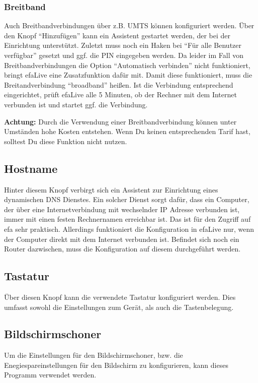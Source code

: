 \documentclass[a4paper,12pt,twoside]{article}
\begin{document}
\subsubsection{Breitband}
\label{breitband}
Auch Breitbandverbindungen über z.B. UMTS können konfiguriert werden.
Über den Knopf "`Hinzufügen"' kann ein
Assistent gestartet werden, der bei der Einrichtung unterstützt.
Zuletzt muss noch ein Haken bei "`Für alle Benutzer
verfügbar"' gesetzt und ggf. die PIN eingegeben werden. Da
leider im Fall von Breitbandverbindungen die Option
"`Automatisch verbinden"' nicht funktioniert,
bringt efaLive eine Zusatzfunktion dafür mit. Damit diese funktioniert,
muss die Breitandverbindung "`broadband"'
heißen. Ist die Verbindung entsprechend eingerichtet, prüft efaLive
alle 5 Minuten, ob der Rechner mit dem Internet verbunden ist und
startet ggf. die Verbindung.

\bigskip
\textbf{Achtung:} Durch die Verwendung einer Breitbandverbindung können unter
Umständen hohe Kosten entstehen. Wenn Du keinen entsprechenden Tarif
hast, solltest Du diese Funktion nicht nutzen.
\bigskip

\subsection{Hostname}
\label{sct:ddns}
Hinter diesem Knopf verbirgt sich ein Assistent zur Einrichtung eines
dynamischen DNS Dienstes. Ein solcher Dienst sorgt dafür, dass ein
Computer, der über eine Internetverbindung mit wechselnder IP Adresse
verbunden ist, immer mit einen festen Rechnernamen erreichbar ist. Das
ist für den Zugriff auf efa sehr praktisch. Allerdings funktioniert die
Konfiguration in efaLive nur, wenn der Computer direkt mit dem Internet
verbunden ist. Befindet sich noch ein Router dazwischen, muss die
Konfiguration auf diesem durchgeführt werden.


\subsection{Tastatur}
\label{sct:tastatur}
Über diesen Knopf kann die verwendete Tastatur konfiguriert werden. Dies
umfasst sowohl die Einstellungen zum Gerät, als auch die
Tastenbelegung.


\subsection{Bildschirmschoner}
\label{bildschirmschoner}
Um die Einstellungen für den Bildschirmschoner, bzw. die
Enegiespareinstellungen für den Bildschirm zu konfigurieren, kann
dieses Programm verwendet werden.
\end{document}
